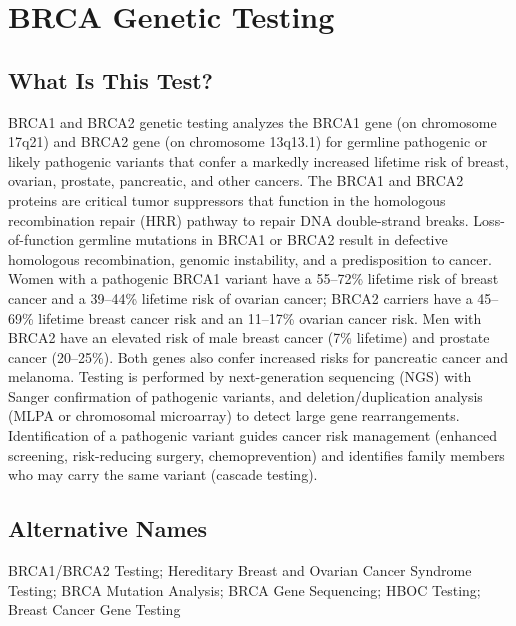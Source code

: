 \chapter{BRCA Genetic Testing}

\section*{What Is This Test?}
BRCA1 and BRCA2 genetic testing analyzes the BRCA1 gene (on chromosome 17q21) and BRCA2 gene (on chromosome 13q13.1) for germline pathogenic or likely pathogenic variants that confer a markedly increased lifetime risk of breast, ovarian, prostate, pancreatic, and other cancers. The BRCA1 and BRCA2 proteins are critical tumor suppressors that function in the homologous recombination repair (HRR) pathway to repair DNA double-strand breaks. Loss-of-function germline mutations in BRCA1 or BRCA2 result in defective homologous recombination, genomic instability, and a predisposition to cancer. Women with a pathogenic BRCA1 variant have a 55--72\% lifetime risk of breast cancer and a 39--44\% lifetime risk of ovarian cancer; BRCA2 carriers have a 45--69\% lifetime breast cancer risk and an 11--17\% ovarian cancer risk. Men with BRCA2 have an elevated risk of male breast cancer (7\% lifetime) and prostate cancer (20--25\%). Both genes also confer increased risks for pancreatic cancer and melanoma. Testing is performed by next-generation sequencing (NGS) with Sanger confirmation of pathogenic variants, and deletion/duplication analysis (MLPA or chromosomal microarray) to detect large gene rearrangements. Identification of a pathogenic variant guides cancer risk management (enhanced screening, risk-reducing surgery, chemoprevention) and identifies family members who may carry the same variant (cascade testing).

\section*{Alternative Names}
BRCA1/BRCA2 Testing; Hereditary Breast and Ovarian Cancer Syndrome Testing; BRCA Mutation Analysis; BRCA Gene Sequencing; HBOC Testing; Breast Cancer Gene Testing

